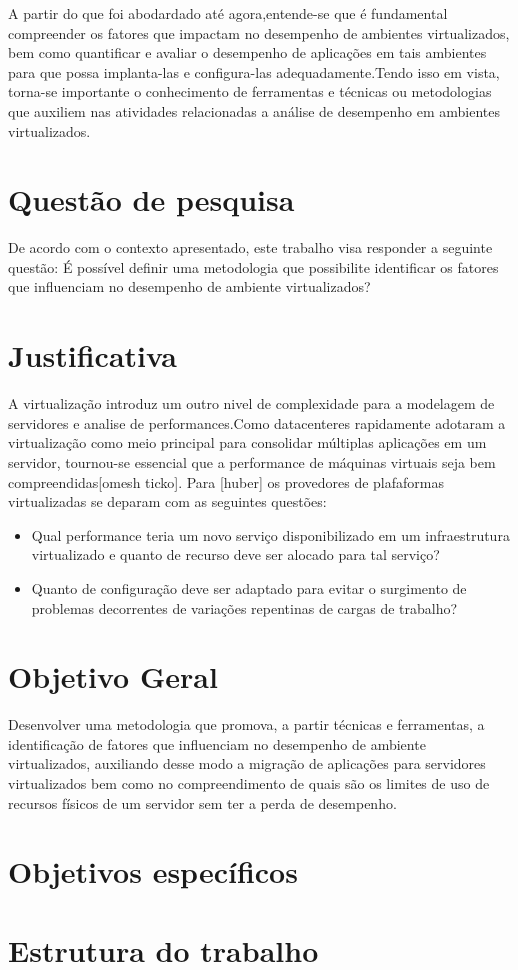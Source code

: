 A partir do que foi abodardado até agora,entende-se que é fundamental compreender os fatores que impactam no desempenho de ambientes virtualizados, bem como quantificar e avaliar o desempenho de aplicações em tais ambientes para que possa implanta-las e configura-las adequadamente.Tendo isso em vista, torna-se importante o conhecimento de ferramentas e técnicas ou metodologias que auxiliem nas atividades relacionadas a análise de desempenho em ambientes virtualizados. 

\section{Quest\~ao de pesquisa}
De acordo com o contexto apresentado, este trabalho visa responder a seguinte questão: É possível definir uma metodologia que possibilite identificar os fatores que influenciam no desempenho de ambiente virtualizados? 

\section{Justificativa}
A virtualização introduz um outro nivel de complexidade para a modelagem de servidores e analise de performances.Como datacenteres rapidamente adotaram a virtualização como meio principal para consolidar múltiplas aplicações em um servidor, tournou-se essencial que a performance de máquinas virtuais seja bem compreendidas[omesh ticko]. Para [huber] os provedores de plafaformas virtualizadas se deparam com as seguintes questões:

\begin{itemize}
  \item Qual performance teria um novo serviço disponibilizado em um infraestrutura virtualizado e quanto de recurso deve ser alocado para tal serviço?

  \item Quanto de configuração deve ser adaptado para evitar o surgimento de problemas decorrentes de variações repentinas de cargas de trabalho? 
\end{itemize}

\section{Objetivo Geral}
Desenvolver uma metodologia que promova, a partir técnicas e ferramentas, a identificação de fatores que influenciam no desempenho de ambiente virtualizados, auxiliando desse modo a migração de aplicações para servidores virtualizados bem como no compreendimento de quais são os limites de uso de recursos físicos de um servidor sem ter a perda de desempenho.   
\section{Objetivos específicos}

\section{Estrutura do trabalho}

